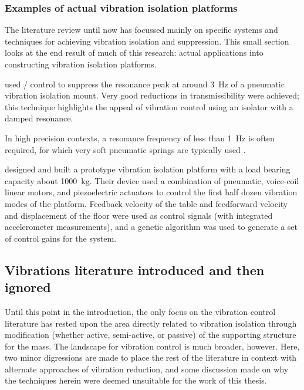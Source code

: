 \subsubsection{Examples of actual vibration isolation platforms}

The literature review until now has focussed mainly on specific systems and techniques for achieving vibration isolation and suppression.
This small section looks at the end result of much of this research: actual applications into constructing vibration isolation platforms.

\textcite{chen2007} used \Hinf/ control to suppress the resonance peak at around \SI{3}{Hz} of a pneumatic vibration isolation mount.
Very good reductions in transmissibility were achieved; this technique highlights the appeal of vibration control using an isolator with a damped resonance.

In high precision contexts, a resonance frequency of less than \SI{1}{Hz} is often required, for which very soft pneumatic springs are typically used \cite{kawashima2007}.

\textcite{yoshioka2001} designed and built a prototype vibration isolation platform with a load bearing capacity about \SI{1000}{kg}.
Their device used a combination of pneumatic, voice-coil linear motors, and piezoelectric actuators to control the first half dozen vibration modes of the platform.
Feedback velocity of the table and feedforward velocity and displacement of the floor were used as control signals (with integrated accelerometer measurements), and a genetic algorithm was used to generate a set of control gains for the system.



\subsection{Vibrations literature introduced and then ignored}

Until this point in the introduction, the only focus on the vibration control literature has rested upon the area directly related to vibration isolation through modification (whether active, semi-active, or passive) of the supporting structure for the mass.
The landscape for vibration control is much broader, however.
Here, two minor digressions are made to place the rest of the literature in context with alternate approaches of vibration reduction, and some discussion made on why the techniques herein were deemed unsuitable for the work of this thesis.


